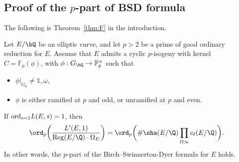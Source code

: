 \subsection{Proof of the \texorpdfstring{$p$}{p}-part of BSD formula}

The following is Theorem~\ref{thm:F} in the introduction.

\begin{theorem}
\notready\label{thm:thmC}
Let $E/\bQ$ be an elliptic curve, and let $p>2$ be a prime of good ordinary reduction for $E$. Assume that $E$ admits a cyclic $p$-isogeny with kernel $C=\mathbb{F}_p(\phi)$, with $\phi:G_\bQ\rightarrow\mathbb{F}_p^\times$ such that
\begin{itemize}
\item $\phi\vert_{G_p}\neq\mathds{1},\omega$,
\item $\phi$ is either ramified at $p$ and odd, or unramified at $p$ and even.
\end{itemize}
If ${\rm ord}_{s=1}L(E,s)=1$, then
\[
\ord_{p}\biggl(\frac{L'(E, 1)}{\operatorname{Reg}(E / \Q) \cdot \Omega_{E}}\biggr)=\ord_{p}\biggl(\# \sha(E / \Q) \prod_{\ell \nmid \infty} c_{\ell}(E / \Q)\biggr).
\]
In other words, the $p$-part of the Birch--Swinnerton-Dyer formula for $E$ holds.
\end{theorem}



